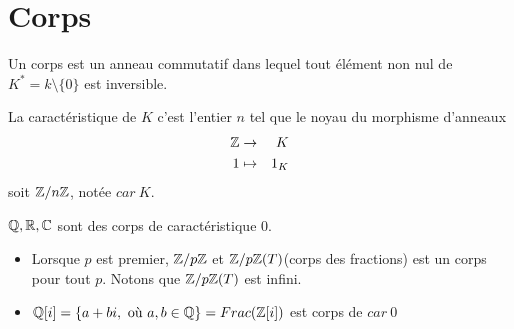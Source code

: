 \section{Corps}


\begin{definition}
	Un corps est un anneau commutatif dans lequel tout élément non nul de $K^* = k \setminus \{0\}$ est inversible.
\end{definition}

\begin{definition}
	La caractéristique de $K$ c'est l'entier $n$ tel que le noyau du morphisme d'anneaux
	\begin{eqnarray*}
		\mathbb{Z} &\to& K \\
		1 &\mapsto& 1_K
	\end{eqnarray*}
	soit $\mathbb{Z}/n\mathbb{Z}$, notée $car \ K$.
\end{definition}

\begin{example}
	$\mathbb{Q}, \mathbb{R}, \mathbb{C}$ sont des corps de caractéristique 0.
	\begin{itemize}
		\item Lorsque $p$ est premier, $\mathbb{Z}/p\mathbb{Z}$ et $\mathbb{Z}/p\mathbb{Z}(T)$(corps des fractions) est un corps pour tout $p$. Notons que $\mathbb{Z}/p\mathbb{Z}(T)$ est infini.
		\item $\mathbb{Q}[i] = \left\{ a + bi, \text{ où } a,b \in \mathbb{Q}\right\} = Frac (\mathbb{Z}[i])$ est corps de $car\ 0$
	\end{itemize}
\end{example}



